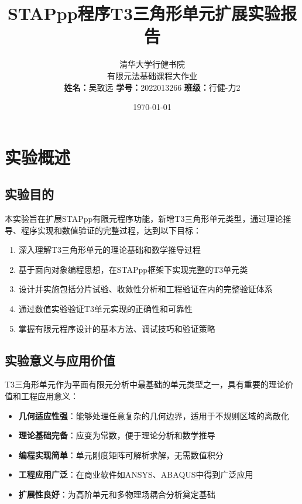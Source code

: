 \documentclass[12pt,a4paper]{article}
\title{\textbf{STAPpp程序T3三角形单元扩展实验报告}}
\author{清华大学行健书院 \\ 有限元法基础课程大作业 \\ 
        \textbf{姓名：}吴致远 \quad \textbf{学号：}2022013266 \quad \textbf{班级：}行健-力2}
\date{\today}
\begin{document}
\maketitle

\tableofcontents
\newpage

\section{实验概述}

\subsection{实验目的}

本实验旨在扩展STAPpp有限元程序功能，新增T3三角形单元类型，通过理论推导、程序实现和数值验证的完整过程，达到以下目标：

\begin{enumerate}
    \item 深入理解T3三角形单元的理论基础和数学推导过程
    \item 基于面向对象编程思想，在STAPpp框架下实现完整的T3单元类
    \item 设计并实施包括分片试验、收敛性分析和工程验证在内的完整验证体系
    \item 通过数值实验验证T3单元实现的正确性和可靠性
    \item 掌握有限元程序设计的基本方法、调试技巧和验证策略
\end{enumerate}

\subsection{实验意义与应用价值}

T3三角形单元作为平面有限元分析中最基础的单元类型之一，具有重要的理论价值和工程应用意义：

\begin{itemize}
    \item \textbf{几何适应性强}：能够处理任意复杂的几何边界，适用于不规则区域的离散化
    \item \textbf{理论基础完备}：应变为常数，便于理论分析和数学推导
    \item \textbf{编程实现简单}：单元刚度矩阵可解析求解，无需数值积分
    \item \textbf{工程应用广泛}：在商业软件如ANSYS、ABAQUS中得到广泛应用
    \item \textbf{扩展性良好}：为高阶单元和多物理场耦合分析奠定基础
\end{itemize}
\end{document}
